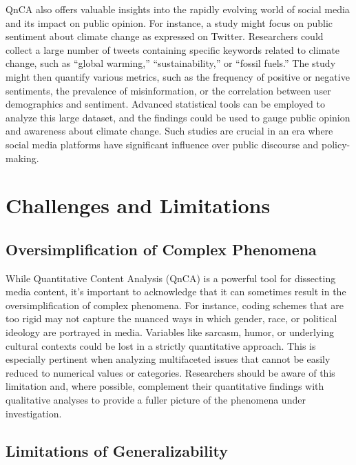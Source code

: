 \documentclass[
  b5paper]{book}
\begin{document}
QnCA also offers valuable insights into the rapidly evolving world of social media and its impact on public opinion. For instance, a study might focus on public sentiment about climate change as expressed on Twitter. Researchers could collect a large number of tweets containing specific keywords related to climate change, such as ``global warming,'' ``sustainability,'' or ``fossil fuels.'' The study might then quantify various metrics, such as the frequency of positive or negative sentiments, the prevalence of misinformation, or the correlation between user demographics and sentiment. Advanced statistical tools can be employed to analyze this large dataset, and the findings could be used to gauge public opinion and awareness about climate change. Such studies are crucial in an era where social media platforms have significant influence over public discourse and policy-making.

\hypertarget{challenges-and-limitations-1}{%
\section{Challenges and Limitations}\label{challenges-and-limitations-1}}

\hypertarget{oversimplification-of-complex-phenomena}{%
\subsection*{Oversimplification of Complex Phenomena}\label{oversimplification-of-complex-phenomena}}

While Quantitative Content Analysis (QnCA) is a powerful tool for dissecting media content, it's important to acknowledge that it can sometimes result in the oversimplification of complex phenomena. For instance, coding schemes that are too rigid may not capture the nuanced ways in which gender, race, or political ideology are portrayed in media. Variables like sarcasm, humor, or underlying cultural contexts could be lost in a strictly quantitative approach. This is especially pertinent when analyzing multifaceted issues that cannot be easily reduced to numerical values or categories. Researchers should be aware of this limitation and, where possible, complement their quantitative findings with qualitative analyses to provide a fuller picture of the phenomena under investigation.

\hypertarget{limitations-of-generalizability}{%
\subsection*{Limitations of Generalizability}\label{limitations-of-generalizability}}
\end{document}
